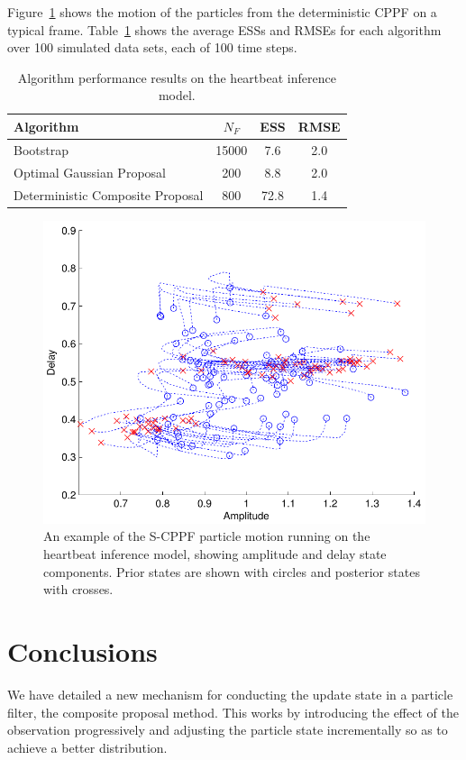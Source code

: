 \documentclass{article}
\begin{document}
Figure~\ref{fig:sineha_example_frame} shows the motion of the particles from the deterministic CPPF on a typical frame. Table~\ref{tab:sineha_results} shows the average ESSs and RMSEs for each algorithm over 100 simulated data sets, each of 100 time steps.%
%
\begin{table}
\centering
\begin{tabular}{l||c|c|c}
Algorithm                                & $N_F$ & ESS  & RMSE \\
\hline
Bootstrap                                & 15000 &  7.6 &  2.0 \\
Optimal Gaussian Proposal                &   200 &  8.8 &  2.0 \\
Deterministic Composite Proposal         &   800 & 72.8 &  1.4 \\
\end{tabular}
\caption{Algorithm performance results on the heartbeat inference model.}
\label{tab:sineha_results}
\end{table}
%
\begin{figure}
\centering
\includegraphics[width=0.45\columnwidth]{sineha_example_frame.pdf}
\caption{An example of the S-CPPF particle motion running on the heartbeat inference model, showing amplitude and delay state components. Prior states are shown with circles and posterior states with crosses.}
\label{fig:sineha_example_frame}
\end{figure}


\section{Conclusions}

We have detailed a new mechanism for conducting the update state in a particle filter, the composite proposal method. This works by introducing the effect of the observation progressively and adjusting the particle state incrementally so as to achieve a better distribution.
\end{document}
